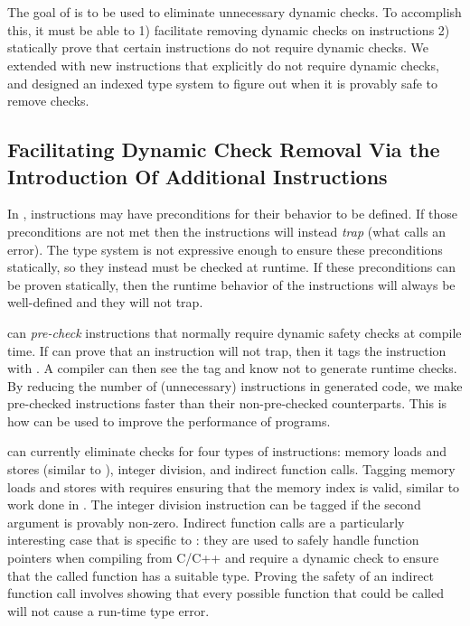 \chapter{\name}
\label{chp:prechk}
The goal of \name is to be used to eliminate unnecessary dynamic checks.
To accomplish this, it must be able to 1) facilitate removing dynamic checks on instructions 2) statically prove that certain instructions do not require dynamic checks.
We extended \wasm with new instructions that explicitly do not require dynamic checks, and designed an indexed type system to figure out when it is provably safe to remove checks. 

\section{Facilitating Dynamic Check Removal Via the Introduction Of Additional Instructions}
\label{sec:newinstructions}
In \wasm, instructions may have preconditions for their behavior to be defined. If those preconditions are not met then the instructions will instead \emph{trap} (what \wasm calls an error).
The \wasm type system is not expressive enough to ensure these preconditions statically, so they instead must be checked at runtime.
If these preconditions can be proven statically, then the runtime behavior of the instructions will always be well-defined and they will not trap.

\name can \emph{pre-check} instructions that normally require dynamic safety checks at compile time.
If \name can prove that an instruction will not trap, then it tags the instruction with \prechk.
A compiler can then see the \prechk tag and know not to generate runtime checks.
By reducing the number of (unnecessary) instructions in generated code, we make pre-checked instructions faster than their non-pre-checked counterparts.
This is how \name can be used to improve the performance of \wasm programs.

\name can currently eliminate checks for four types of instructions: memory loads and stores (similar to \dtal), integer division, and indirect function calls.
Tagging memory loads and stores with \prechk requires ensuring that the memory index is valid, similar to work done in \dtal.
The integer division instruction can be \prechk tagged if the second argument is provably non-zero.
Indirect function calls are a particularly interesting case that is specific to \wasm: they are used to safely handle function pointers when compiling from C/C++ and require a dynamic check to ensure that the called function has a suitable type.
Proving the safety of an indirect function call involves showing that every possible function that could be called will not cause a run-time type error.

